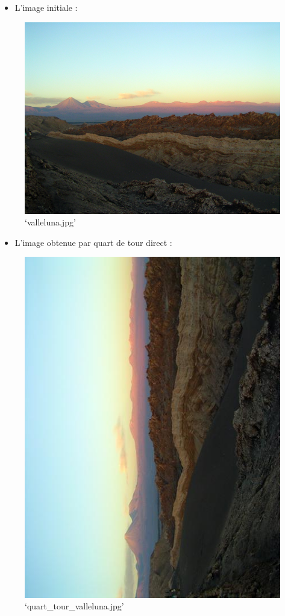 \documentclass[11pt]{article}
\makeatletter
\def\maxwidth{\ifdim\Gin@nat@width>\linewidth\linewidth
    \else\Gin@nat@width\fi}
\let\Oldincludegraphics\includegraphics
\renewcommand{\includegraphics}[1]{\Oldincludegraphics[width=.8\maxwidth]{#1}}
\providecommand{\tightlist}{%
      \setlength{\itemsep}{0pt}\setlength{\parskip}{0pt}}
\makeatother
\begin{document}
    \begin{itemize}
\tightlist
\item
  L'image initiale :
\end{itemize}

\begin{figure}
\centering
\includegraphics{valleluna.jpg}
\caption{`valleluna.jpg'}
\end{figure}

\begin{itemize}
\tightlist
\item
  L'image obtenue par quart de tour direct :
\end{itemize}

\begin{figure}
\centering
\includegraphics{quart_tour_valleluna.jpg}
\caption{`quart\_tour\_valleluna.jpg'}
\end{figure}
\end{document}
